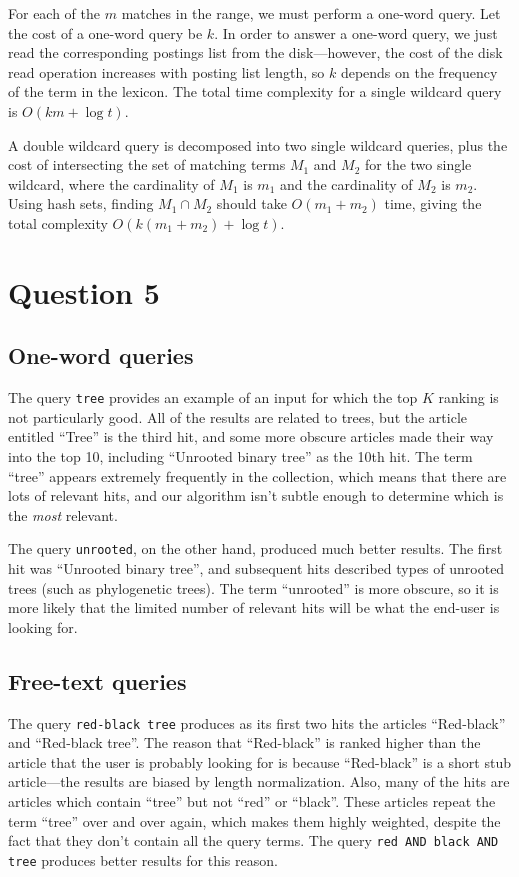 \documentclass[11pt]{article}
\begin{document}
For each of the $m$ matches in the range, we must perform a one-word query. Let the cost of a one-word query
be $k$. In order to answer a one-word query, we just read the corresponding postings list from the disk---however,
the cost of the disk read operation increases with posting list length, so $k$ depends on the frequency of the term in the
lexicon. The total time complexity for a single wildcard query is $O(km + \log t)$.

A double wildcard query is decomposed into two single wildcard queries, plus the cost of intersecting the
set of matching terms $M_{1}$ and $M_{2}$ for the two single wildcard, where the cardinality of $M_{1}$ is $m_{1}$ and
the cardinality of $M_{2}$ is $m_{2}$. Using hash sets, finding $M_{1} \cap M_{2}$ should take $O(m_{1} + m_{2})$ time,
giving the total complexity $O(k(m_{1} + m_{2}) + \log t)$.

\section{Question 5}

\subsection{One-word queries}

The query \texttt{tree} provides an example of an input for which the top $K$ ranking is not
particularly good. All of the results are related to trees, but the article entitled ``Tree'' is
the third hit, and some more obscure articles made their way into the top 10, including ``Unrooted
binary tree'' as the 10th hit. The term ``tree'' appears extremely frequently in the collection, which
means that there are lots of relevant hits, and our algorithm isn't subtle enough to determine which
is the \textit{most} relevant.

The query \texttt{unrooted}, on the other hand, produced much better results. The first hit was
``Unrooted binary tree'', and subsequent hits described types of unrooted trees (such as phylogenetic
trees). The term ``unrooted'' is more obscure, so it is more likely that the limited number of relevant
hits will be what the end-user is looking for.

\subsection{Free-text queries}

The query \texttt{red-black tree} produces as its first two hits the articles ``Red-black'' and
``Red-black tree''. The reason that ``Red-black'' is ranked higher than the article that the user
is probably looking for is because ``Red-black'' is a short stub article---the results are biased
by length normalization. Also, many of the hits are articles which contain ``tree'' but not
``red'' or ``black''. These articles repeat the term ``tree'' over and over again, which makes
them highly weighted, despite the fact that they don't contain all the query terms. The query
\texttt{red AND black AND tree} produces better results for this reason.
\end{document}
